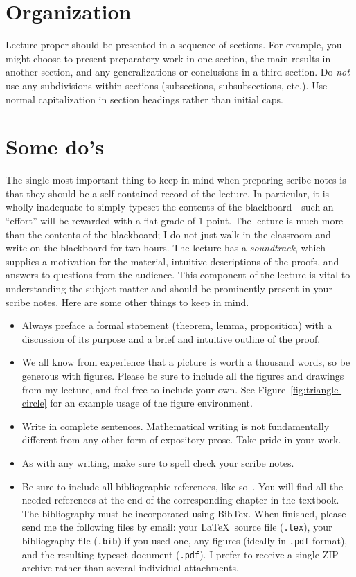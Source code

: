 \documentclass[usletter]{article}
\begin{document}
\section{Organization}
Lecture proper should be presented in a sequence of
sections. For example, you might choose to present
preparatory work in one section, the main results in
another section, and any generalizations or conclusions
in a third section. Do \emph{not} use any subdivisions
within sections (subsections, subsubsections, etc.).
Use normal capitalization in section headings rather
than initial caps.

\section{Some do's}
The single most important thing to keep in mind when
preparing scribe notes is that they should be a
self-contained record of the lecture.  In
particular, it is wholly inadequate to simply typeset
the contents of the blackboard---such an ``effort'' will
be rewarded with a flat grade of 1 point.  The lecture
is much more than the contents of the
blackboard; I do not just walk in the classroom and
write on the blackboard for two hours. The lecture has
a \emph{soundtrack}, which supplies a motivation for
the material, intuitive descriptions of the proofs, and
answers to questions from the audience.  This component
of the lecture is vital to understanding the subject
matter and should be prominently present in your scribe
notes.  Here are some other things to keep in mind.

\begin{itemize}
\item Always preface a formal statement (theorem,
lemma, proposition) with a discussion of its purpose
and a brief and intuitive outline of the proof.

\item We all know from experience that a picture is
worth a thousand words, so be generous with figures.
Please be sure to include all the figures and drawings
from my lecture, and feel free to include your own. See
Figure~\ref{fig:triangle-circle} for an example usage
of the figure environment.

\item Write in complete sentences.  Mathematical
writing is not fundamentally different from any other
form of expository prose. Take pride in your work.

\item As with any writing, make sure to spell check
your scribe notes.

\item Be sure to include all bibliographic references,
like so~\cite{textbook}. You will find all the needed
references at the end of the corresponding chapter in the
textbook. The bibliography must be incorporated using
BibTex.  When finished, please send me the following
files by email: your \LaTeX\ source file ({\tt .tex}),
your bibliography file ({\tt .bib}) if you used one,
any figures (ideally in {\tt .pdf} format), and the
resulting typeset document ({\tt .pdf}).   I prefer to
receive a single ZIP archive rather than several
individual attachments.
\end{itemize}
\end{document}
